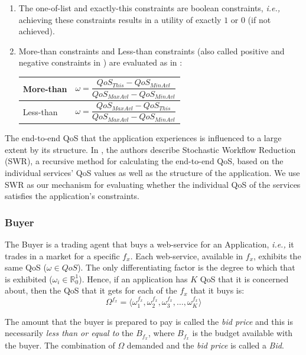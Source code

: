 \documentclass[10pt,journal,compsoc]{IEEEtran}
\begin{document}
\begin{enumerate}
\item The one-of-list and exactly-this constraints are boolean constraints, \textit{i.e.,} achieving these constraints results in a utility of exactly $1$ or $0$ (if not achieved). 
\item More-than constraints and Less-than constraints (also called positive and negative constraints in \cite{Ardagna2007Adaptive}) are evaluated as in \cite{Ardagna2007Adaptive}: 
\hspace{1cm}
\begin{table}[h]
\begin{tabular}{|p{1cm}p{5cm}|}
\hline
More-than & \[ \omega = \frac{QoS_{This} - QoS_{MinAvl}}{QoS_{MaxAvl} - QoS_{MinAvl}} \] \\
\hline
Less-than & \[ \omega = \frac{QoS_{MaxAvl} - QoS_{This}}{QoS_{MaxAvl} - QoS_{MinAvl}} \] \\
\hline
\end{tabular}
\end{table}
\end{enumerate}
The end-to-end QoS that the application experiences is influenced to a large extent by its structure. In \cite{Cardoso2004}, the authors describe Stochastic Workflow Reduction (SWR), a recursive method for calculating the end-to-end QoS, based on the individual services' QoS values as well as the structure of the application. We use SWR as our mechanism for evaluating whether the individual QoS of the services satisfies the application's constraints. 

\subsubsection{Buyer}
The Buyer is a trading agent that buys a web-service for an Application, \textit{i.e.,} it trades in a market for a specific $f_x$. Each web-service, available in $f_x$, exhibits the same QoS ($\omega \in QoS$). The only differentiating factor is the degree to which that is exhibited  ($ \omega_{i} \in \mathbb{R}_{0}^{1} $). Hence, if an application has $K$ QoS that it is concerned about, then the QoS that it gets for each of the $f_{x}$ that it buys is:
	 \begin{equation}
	  \Omega^{f_{x}} = \langle \omega_{1}^{f_x}, \omega_{2}^{f_x}, \omega_{3}^{f_x}, \ldots, \omega_{K}^{f_x} \rangle \label{eq:exhibited_qa}
	 \end{equation}

The amount that the buyer is prepared to pay is called the \textsl{bid price} and this is necessarily \textit{less than or equal to} the $B_{f_x}$, where $B_{f_x}$ is the budget available with the buyer. The combination of $\Omega$ demanded and the \textsl{bid price} is called a \textsl{Bid}.
\end{document}
